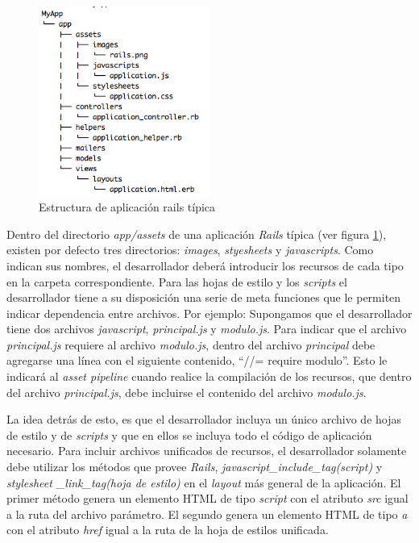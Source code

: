 \begin{figure}[h]
\centering
\includegraphics[width=0.5\textwidth]{figuras/rails_app.png}
	\caption{Estructura de aplicación rails típica}
    \label{fig.aplicacion_rails_tipica}
\end{figure}

Dentro del directorio \emph{app/assets} de una aplicación \emph{Rails} típica (ver figura \ref{fig.aplicacion_rails_tipica}), existen por defecto tres directorios:
\emph{images}, \emph{styesheets} y \emph{javascripts}. Como indican sus nombres, el desarrollador deberá introducir los recursos de cada tipo en la carpeta correspondiente. Para
las hojas de estilo y los \emph{scripts} el desarrollador tiene a su disposición una serie de meta funciones que le permiten indicar dependencia entre archivos. Por ejemplo:
Supongamos que el desarrollador tiene dos archivos \emph{javascript}, \emph{principal.js} y \emph{modulo.js}. Para indicar que el archivo \emph{principal.js} requiere al archivo \emph{modulo.js}, dentro
del archivo \emph{principal} debe agregarse una línea con el siguiente contenido, ``//= require modulo''. Esto le indicará al \emph{asset pipeline} cuando realice la compilación de los
recursos, que dentro del archivo \emph{principal.js}, debe incluirse el contenido del archivo \emph{modulo.js}. 

La idea detrás de esto, es que el desarrollador incluya un único archivo de hojas
de estilo y de \emph{scripts} y que en ellos se incluya todo el código de aplicación necesario. Para incluir archivos unificados de recursos, el desarrollador solamente debe
utilizar los métodos que provee \emph{Rails}, \emph{javascript\_include\_tag(script)} y \emph{stylesheet \_link\_tag(hoja de estilo)} en el \emph{layout} más general de la aplicación. El
primer método genera un elemento HTML de tipo \emph{script} con el atributo \emph{src} igual a la ruta del archivo parámetro. El segundo genera un elemento HTML de tipo
\emph{a} con el atributo \emph{href} igual a la ruta de la hoja de estilos unificada.

